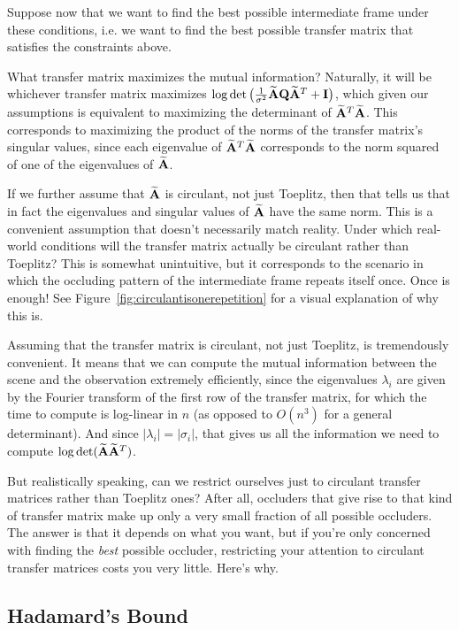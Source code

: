 Suppose now that we want to find the best possible intermediate frame under these conditions, i.e. we want to find the best possible transfer matrix that satisfies the constraints above. 

What transfer matrix maximizes the mutual information? Naturally, it will be whichever transfer matrix maximizes $\log\det\big( \frac{1}{\sigma^2}\widetilde{\mathbf{A}}\mathbf{Q}\widetilde{\mathbf{A}}^T + \mathbf{I} \big)$, which given our assumptions is equivalent to maximizing the determinant of $\widetilde{\mathbf{A}}^T \widetilde{\mathbf{A}}$. This corresponds to maximizing the product of the norms of the transfer matrix's singular values, since each eigenvalue of $\widetilde{\mathbf{A}}^T \widetilde{\mathbf{A}}$ corresponds to the norm squared of one of the eigenvalues of $\widetilde{\mathbf{A}}$.

If we further assume that $\widetilde{\mathbf{A}}$ is circulant, not just Toeplitz, then that tells us that in fact the eigenvalues and singular values of $\widetilde{\mathbf{A}}$ have the same norm. This is a convenient assumption that doesn't necessarily match reality. Under which real-world conditions will the transfer matrix actually be circulant rather than Toeplitz? This is somewhat unintuitive, but it corresponds to the scenario in which the occluding pattern of the intermediate frame repeats itself once. Once is enough! See Figure~\ref{fig:circulantisonerepetition} for a visual explanation of why this is.

Assuming that the transfer matrix is circulant, not just Toeplitz, is tremendously convenient. It means that we can compute the mutual information between the scene and the observation extremely efficiently, since the eigenvalues $\lambda_i$ are given by the Fourier transform of the first row of the transfer matrix, for which the time to compute is log-linear in $n$ (as opposed to $O(n^3)$ for a general determinant). And since $|\lambda_i| = |\sigma_i|$, that gives us all the information we need to compute $\log \det (\widetilde{\mathbf{A}} \widetilde{\mathbf{A}}^T)$.

But realistically speaking, can we restrict ourselves just to circulant transfer matrices rather than Toeplitz ones? After all, occluders that give rise to that kind of transfer matrix make up only a very small fraction of all possible occluders. The answer is that it depends on what you want, but if you're only concerned with finding the \emph{best} possible occluder, restricting your attention to circulant transfer matrices costs you very little. Here's why.


\subsection{Hadamard's Bound}

